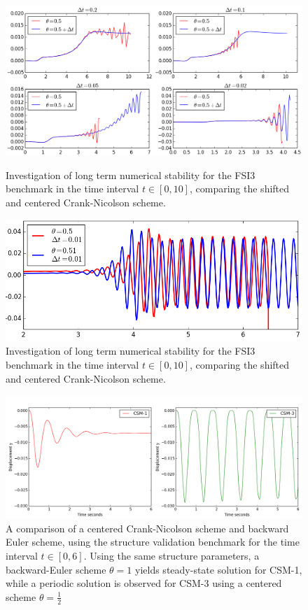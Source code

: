 \begin{figure}[h!]
        \centering
    \includegraphics[scale=0.6]{./Fig/thetacheck.png} \\
      \caption{Investigation of long term numerical stability for the FSI3 benchmark in the time interval $t \in [0, 10]$, comparing the shifted and centered Crank-Nicolson scheme. }
\label{fig:cncomp1}
\end{figure}
\begin{figure}[h!]
        \centering
    \includegraphics[scale=0.6]{./Fig/besttheta.png}
      \caption{Investigation of long term numerical stability for the FSI3 benchmark in the time interval $t \in [0, 10]$,  comparing the shifted and centered Crank-Nicolson scheme. }
\label{fig:cncomp2}
\end{figure}
\newpage
\begin{figure}[h!]
        \centering
    \includegraphics[scale=0.4]{./Fig/thetacompare.png}
      \caption{A comparison of a centered Crank-Nicolson scheme and backward Euler scheme, using the structure validation benchmark for the time interval  $t \in [0, 6]$. Using the same structure parameters, a backward-Euler scheme $\theta = 1$ yields steady-state solution for CSM-1, while a periodic solution is observed for CSM-3 using a centered scheme $\theta = \frac{1}{2}$  }
\label{fig:csm1scm3}
\end{figure}
\newpage
